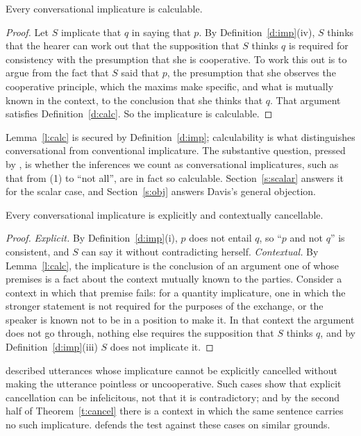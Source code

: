 \documentclass{situationist-preprint}
\begin{document}
\begin{lemma}\label{l:calc}
Every conversational implicature is calculable.
\end{lemma}

\begin{proof}
Let $S$ implicate that $q$ in saying that $p$. By Definition~\ref{d:imp}(iv), $S$ thinks that the hearer can work out that the supposition that $S$ thinks $q$ is required for consistency with the presumption that she is cooperative. To work this out is to argue from the fact that $S$ said that $p$, the presumption that she observes the cooperative principle, which the maxims make specific, and what is mutually known in the context, to the conclusion that she thinks that $q$. That argument satisfies Definition~\ref{d:calc}. So the implicature is calculable.
\end{proof}

Lemma~\ref{l:calc} is secured by Definition~\ref{d:imp}; calculability is what distinguishes conversational from conventional implicature. The substantive question, pressed by \citet{Davis1998}, is whether the inferences we count as conversational implicatures, such as that from (1) to \enquote{not all}, are in fact so calculable. Section~\ref{s:scalar} answers it for the scalar case, and Section~\ref{s:obj} answers Davis's general objection.

\begin{theorem}[Cancellability]\label{t:cancel}
Every conversational implicature is explicitly and contextually cancellable.
\end{theorem}

\begin{proof}
\emph{Explicit.} By Definition~\ref{d:imp}(i), $p$ does not entail $q$, so \enquote{$p$ and not $q$} is consistent, and $S$ can say it without contradicting herself. \emph{Contextual.} By Lemma~\ref{l:calc}, the implicature is the conclusion of an argument one of whose premises is a fact about the context mutually known to the parties. Consider a context in which that premise fails: for a quantity implicature, one in which the stronger statement is not required for the purposes of the exchange, or the speaker is known not to be in a position to make it. In that context the argument does not go through, nothing else requires the supposition that $S$ thinks $q$, and by Definition~\ref{d:imp}(iii) $S$ does not implicate it.
\end{proof}

\citet{Weiner2006} described utterances whose implicature cannot be explicitly cancelled without making the utterance pointless or uncooperative. Such cases show that explicit cancellation can be infelicitous, not that it is contradictory; and by the second half of Theorem~\ref{t:cancel} there is a context in which the same sentence carries no such implicature. \citet{BlomeTillmann2008} defends the test against these cases on similar grounds.
\end{document}
